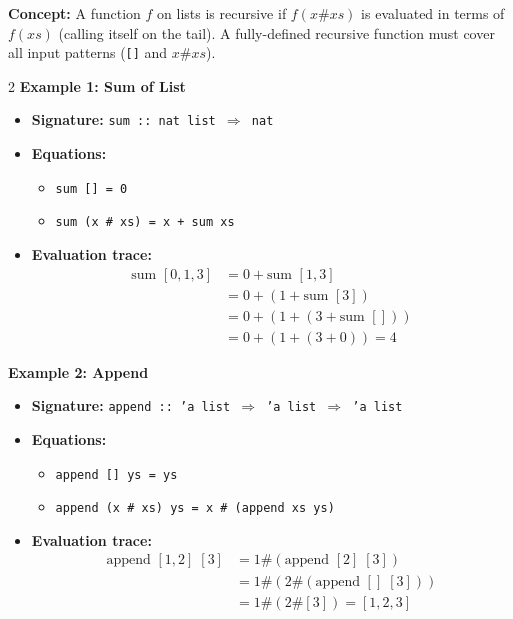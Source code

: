 \documentclass[10pt,a4paper]{article}
\begin{document}
\begin{tcolorbox}[title={2. Recursive Functions on Lists}]
\textbf{Concept:} A function $f$ on lists is recursive if $f(x \# xs)$ is evaluated in terms of $f(xs)$ (calling itself on the tail). A fully-defined recursive function must cover all input patterns (\texttt{[]} and $x \# xs$).

\begin{multicols}{2}
\textbf{Example 1: Sum of List}
\begin{itemize}[leftmargin=1.2em, itemsep=2pt]
    \item \textbf{Signature:} \texttt{sum :: nat list $\Rightarrow$ nat}
    \item \textbf{Equations:}
    \begin{itemize}[leftmargin=1em, label=$\bullet$]
        \item \texttt{sum [] = 0}
        \item \texttt{sum (x \# xs) = x + sum xs}
    \end{itemize}
    \item \textbf{Evaluation trace:}
    \begin{align*}
    \text{sum }[0,1,3] &= 0 + \text{sum }[1,3] \\
    &= 0 + (1 + \text{sum }[3]) \\
    &= 0 + (1 + (3 + \text{sum }[])) \\
    &= 0 + (1 + (3 + 0)) = 4
    \end{align*}
\end{itemize}

\columnbreak

\textbf{Example 2: Append}
\begin{itemize}[leftmargin=1.2em, itemsep=2pt]
    \item \textbf{Signature:} \texttt{append :: 'a list $\Rightarrow$ 'a list $\Rightarrow$ 'a list}
    \item \textbf{Equations:}
    \begin{itemize}[leftmargin=1em, label=$\bullet$]
        \item \texttt{append [] ys = ys}
        \item \texttt{append (x \# xs) ys = x \# (append xs ys)}
    \end{itemize}
    \item \textbf{Evaluation trace:}
    \begin{align*}
    \text{append }[1,2]\;[3] &= 1 \# (\text{append }[2]\;[3]) \\
    &= 1 \# (2 \# (\text{append }[]\;[3])) \\
    &= 1 \# (2 \# [3]) = [1,2,3]
    \end{align*}
\end{itemize}
\end{multicols}
\end{tcolorbox}
\end{document}
